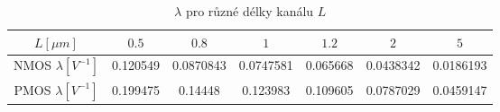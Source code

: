 \begin{table}[H]
    \centering
    \begin{tabular}{|c|c|c|c|c|c|c|}
        \hline
        \(L [\mu m]\)               & \(0.5\)    & \(0.8\)   & \(1\)     & \(1.2\)   & \(2\)     & \(5\)     \\ \hline
        NMOS \(\lambda [V^{-1}]\)   & 0.120549   & 0.0870843 & 0.0747581 & 0.065668  & 0.0438342 & 0.0186193 \\ \hline  
        PMOS \(\lambda [V^{-1}]\)   & 0.199475   & 0.14448   & 0.123983  & 0.109605  & 0.0787029 & 0.0459147 \\ \hline  
    \end{tabular}
    \caption{\(\lambda\) pro různé délky kanálu \(L\)}
    \label{tab:bulkEfekt}
\end{table}
